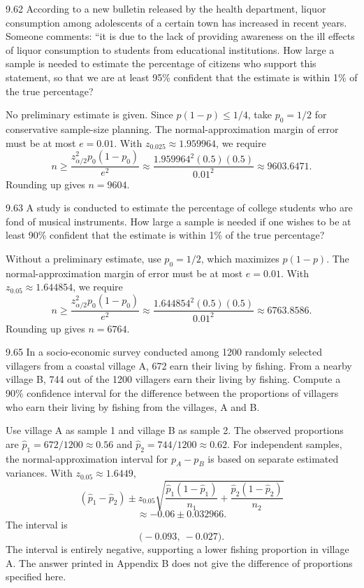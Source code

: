 \documentclass[11pt,oneside]{article}
\begin{document}
\begin{exercise}{9.62}
According to a new bulletin released by the health department, liquor consumption among adolescents of a certain town has increased in recent years. Someone comments: ``it is due to the lack of providing awareness on the ill effects of liquor consumption to students from educational institutions. How large a sample is needed to estimate the percentage of citizens who support this statement, so that we are at least 95\% confident that the estimate is within 1\% of the true percentage?
\end{exercise}
\begin{solution}
No preliminary estimate is given. Since $p(1-p)\le1/4$, take $p_0=1/2$ for conservative sample-size planning. The normal-approximation margin of error must be at most $e=0.01$. With $z_{0.025}\approx 1.959964$, we require
\[
n\ge \frac{z_{\alpha/2}^2p_0(1-p_0)}{e^2}\approx \frac{1.959964^2(0.5)(0.5)}{0.01^2}\approx 9603.6471.
\]
Rounding up gives $\boxed{n=9604}$.
\end{solution}

\begin{exercise}{9.63}
A study is conducted to estimate the percentage of college students who are fond of musical instruments. How large a sample is needed if one wishes to be at least 90\% confident that the estimate is within 1\% of the true percentage?
\end{exercise}
\begin{solution}
Without a preliminary estimate, use $p_0=1/2$, which maximizes $p(1-p)$. The normal-approximation margin of error must be at most $e=0.01$. With $z_{0.05}\approx 1.644854$, we require
\[
n\ge \frac{z_{\alpha/2}^2p_0(1-p_0)}{e^2}\approx \frac{1.644854^2(0.5)(0.5)}{0.01^2}\approx 6763.8586.
\]
Rounding up gives $\boxed{n=6764}$.
\end{solution}

\begin{exercise}{9.65}
In a socio-economic survey conducted among 1200 randomly selected villagers from a coastal village A, 672 earn their living by fishing. From a nearby village B, 744 out of the 1200 villagers earn their living by fishing. Compute a 90\% confidence interval for the difference between the proportions of villagers who earn their living by fishing from the villages, A and B.
\end{exercise}
\begin{solution}
Use village A as sample 1 and village B as sample 2. The observed proportions are $\hat p_1=672/1200\approx0.56$ and $\hat p_2=744/1200\approx0.62$. For independent samples, the normal-approximation interval for $p_A-p_B$ is based on separate estimated variances. With $z_{0.05}\approx1.6449$,
\[
(\hat p_1-\hat p_2)\pm z_{0.05}\sqrt{\frac{\hat p_1(1-\hat p_1)}{n_1}+\frac{\hat p_2(1-\hat p_2)}{n_2}}
\]
\[
\approx -0.06\pm0.032966.
\]
The interval is 
\[
\boxed{\bigl(-0.093,\ -0.027\bigr)}.
\]
The interval is entirely negative, supporting a lower fishing proportion in village A. The answer printed in Appendix B does not give the difference of proportions specified here.
\end{solution}
\end{document}
